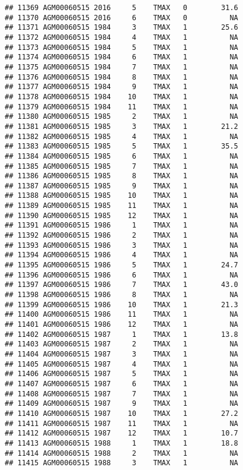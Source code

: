 \documentclass{article}\usepackage[]{graphicx}\usepackage[]{color}
\makeatletter
\newenvironment{kframe}{%
 \def\at@end@of@kframe{}%
 \ifinner\ifhmode%
  \def\at@end@of@kframe{\end{minipage}}%
  \begin{minipage}{\columnwidth}%
 \fi\fi%
 \def\FrameCommand##1{\hskip\@totalleftmargin \hskip-\fboxsep
 \colorbox{shadecolor}{##1}\hskip-\fboxsep
     \hskip-\linewidth \hskip-\@totalleftmargin \hskip\columnwidth}%
 \MakeFramed {\advance\hsize-\width
   \@totalleftmargin\z@ \linewidth\hsize
   \@setminipage}}%
 {\par\unskip\endMakeFramed%
 \at@end@of@kframe}
\newenvironment{knitrout}{}{} %
\makeatother
\begin{document}
\begin{knitrout}
\begin{kframe}
\begin{verbatim}
## 11369 AGM00060515 2016     5    TMAX   0        31.6
## 11370 AGM00060515 2016     6    TMAX   0          NA
## 11371 AGM00060515 1984     3    TMAX   1        25.6
## 11372 AGM00060515 1984     4    TMAX   1          NA
## 11373 AGM00060515 1984     5    TMAX   1          NA
## 11374 AGM00060515 1984     6    TMAX   1          NA
## 11375 AGM00060515 1984     7    TMAX   1          NA
## 11376 AGM00060515 1984     8    TMAX   1          NA
## 11377 AGM00060515 1984     9    TMAX   1          NA
## 11378 AGM00060515 1984    10    TMAX   1          NA
## 11379 AGM00060515 1984    11    TMAX   1          NA
## 11380 AGM00060515 1985     2    TMAX   1          NA
## 11381 AGM00060515 1985     3    TMAX   1        21.2
## 11382 AGM00060515 1985     4    TMAX   1          NA
## 11383 AGM00060515 1985     5    TMAX   1        35.5
## 11384 AGM00060515 1985     6    TMAX   1          NA
## 11385 AGM00060515 1985     7    TMAX   1          NA
## 11386 AGM00060515 1985     8    TMAX   1          NA
## 11387 AGM00060515 1985     9    TMAX   1          NA
## 11388 AGM00060515 1985    10    TMAX   1          NA
## 11389 AGM00060515 1985    11    TMAX   1          NA
## 11390 AGM00060515 1985    12    TMAX   1          NA
## 11391 AGM00060515 1986     1    TMAX   1          NA
## 11392 AGM00060515 1986     2    TMAX   1          NA
## 11393 AGM00060515 1986     3    TMAX   1          NA
## 11394 AGM00060515 1986     4    TMAX   1          NA
## 11395 AGM00060515 1986     5    TMAX   1        24.7
## 11396 AGM00060515 1986     6    TMAX   1          NA
## 11397 AGM00060515 1986     7    TMAX   1        43.0
## 11398 AGM00060515 1986     8    TMAX   1          NA
## 11399 AGM00060515 1986    10    TMAX   1        21.3
## 11400 AGM00060515 1986    11    TMAX   1          NA
## 11401 AGM00060515 1986    12    TMAX   1          NA
## 11402 AGM00060515 1987     1    TMAX   1        13.8
## 11403 AGM00060515 1987     2    TMAX   1          NA
## 11404 AGM00060515 1987     3    TMAX   1          NA
## 11405 AGM00060515 1987     4    TMAX   1          NA
## 11406 AGM00060515 1987     5    TMAX   1          NA
## 11407 AGM00060515 1987     6    TMAX   1          NA
## 11408 AGM00060515 1987     7    TMAX   1          NA
## 11409 AGM00060515 1987     9    TMAX   1          NA
## 11410 AGM00060515 1987    10    TMAX   1        27.2
## 11411 AGM00060515 1987    11    TMAX   1          NA
## 11412 AGM00060515 1987    12    TMAX   1        10.7
## 11413 AGM00060515 1988     1    TMAX   1        18.8
## 11414 AGM00060515 1988     2    TMAX   1          NA
## 11415 AGM00060515 1988     3    TMAX   1          NA

\end{verbatim}
\end{kframe}
\end{knitrout}
\end{document}
